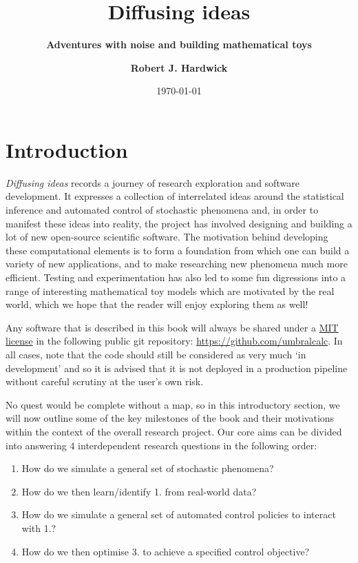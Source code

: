 \documentclass{book}
\title{\Huge \bfseries\sffamily Diffusing ideas}
\subtitle{\Large \bfseries\sffamily \color{gray75} Adventures with noise and building mathematical toys}
\author{\bfseries\sffamily Robert J. Hardwick}
\date{\today}
\begin{document}
\maketitle
\frontmatter

\chapter*{Introduction}

\emph{Diffusing ideas} records a journey of research exploration and software development. It expresses a collection of interrelated ideas around the statistical inference and automated control of stochastic phenomena and, in order to manifest these ideas into reality, the project has involved designing and building a lot of new open-source scientific software. The motivation behind developing these computational elements is to form a foundation from which one can build a variety of new applications, and to make researching new phenomena much more efficient. Testing and experimentation has also led to some fun digressions into a range of interesting mathematical toy models which are motivated by the real world, which we hope that the reader will enjoy exploring them as well!

Any software that is described in this book will always be shared under a \href{https://opensource.org/licenses/MIT}{MIT license} in the following public git repository: \href{https://github.com/umbralcalc}{https://github.com/umbralcalc}. In all cases, note that the code should still be considered as very much `in development' and so it is advised that it is not deployed in a production pipeline without careful scrutiny at the user's own risk. 

No quest would be complete without a map, so in this introductory section, we will now outline some of the key milestones of the book and their motivations within the context of the overall research project. Our core aims can be divided into answering 4 interdependent research questions in the following order:

\begin{enumerate} 
\item{How do we simulate a general set of stochastic phenomena?}
\item{How do we then learn/identify 1. from real-world data?}
\item{How do we simulate a general set of automated control policies to interact with 1.?}
\item{How do we then optimise 3. to achieve a specified control objective?} 
\end{enumerate}
\end{document}
